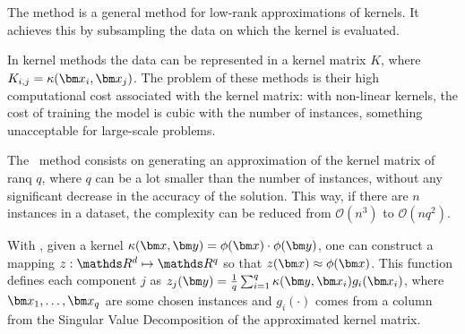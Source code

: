 \section{\Nys}

\begin{pre-delivery}
  The \Nys\cite{NIPS2000_1866} method is a general method for low-rank approximations of
  kernels. It achieves this by subsampling the data on which the kernel
  is evaluated.

  In kernel methods the data can be represented in a kernel matrix $K$, where
  $K_{i,j} = \kernel(\vx_i, \vx_j)$. The problem of these methods is their
  high computational cost associated with the kernel matrix: with non-linear
  kernels, the cost of training the model is cubic with the number of
  instances, something unacceptable for large-scale problems.

  The \Nys\ method consists on generating an approximation of the kernel matrix of
  ranq $q$, where $q$ can be a lot smaller than the number of instances, without
  any significant decrease in the accuracy of the solution. This way, if there
  are $n$ instances in a dataset, the complexity can be reduced from
  $\mathcal{O}(n^3)$ to $\mathcal{O}(nq^2)$.

  With \Nys, given a kernel $\kernel(\vx, \vy) = \phi(\vx)\cdot\phi(\vy)$, one can
  construct a mapping $z: \reals^d \mapsto \reals^q$ so that
  $z(\vx) \approx \phi(\vx)$. This function defines each component $j$ as
  $z_j(\vy) = \frac{1}{q}\sum_{i = 1}^q \kernel(\vy, \vx_i)g_i(\vx_i)$,
  where $\vx_1, \ldots, \vx_q$ are some chosen instances and
  $g_i(\cdot)$ comes from a column from the Singular Value Decomposition
  of the approximated kernel matrix.
\end{pre-delivery}
